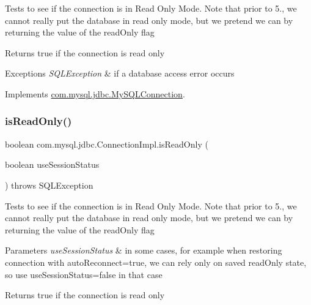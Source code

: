 Tests to see if the connection is in Read Only Mode. Note that prior to 5., we cannot really put the database in read only mode, but we pretend we can by returning the value of the read\+Only flag

\begin{DoxyReturn}{Returns}
true if the connection is read only 
\end{DoxyReturn}

\begin{DoxyExceptions}{Exceptions}
{\em S\+Q\+L\+Exception} & if a database access error occurs \\
\hline
\end{DoxyExceptions}


Implements \mbox{\hyperlink{interfacecom_1_1mysql_1_1jdbc_1_1_my_s_q_l_connection}{com.\+mysql.\+jdbc.\+My\+S\+Q\+L\+Connection}}.

\mbox{\label{classcom_1_1mysql_1_1jdbc_1_1_connection_impl_a3f699d7389893a020730690607aae67c}} 
\subsubsection{\texorpdfstring{is\+Read\+Only()}{isReadOnly()}\hspace{0.1cm}{\footnotesize\ttfamily [2/2]}}
{\footnotesize\ttfamily boolean com.\+mysql.\+jdbc.\+Connection\+Impl.\+is\+Read\+Only (\begin{DoxyParamCaption}\item[{boolean}]{use\+Session\+Status }\end{DoxyParamCaption}) throws S\+Q\+L\+Exception}

Tests to see if the connection is in Read Only Mode. Note that prior to 5., we cannot really put the database in read only mode, but we pretend we can by returning the value of the read\+Only flag


\begin{DoxyParams}{Parameters}
{\em use\+Session\+Status} & in some cases, for example when restoring connection with auto\+Reconnect=true, we can rely only on saved read\+Only state, so use use\+Session\+Status=false in that case\\
\hline
\end{DoxyParams}
\begin{DoxyReturn}{Returns}
true if the connection is read only 
\end{DoxyReturn}

